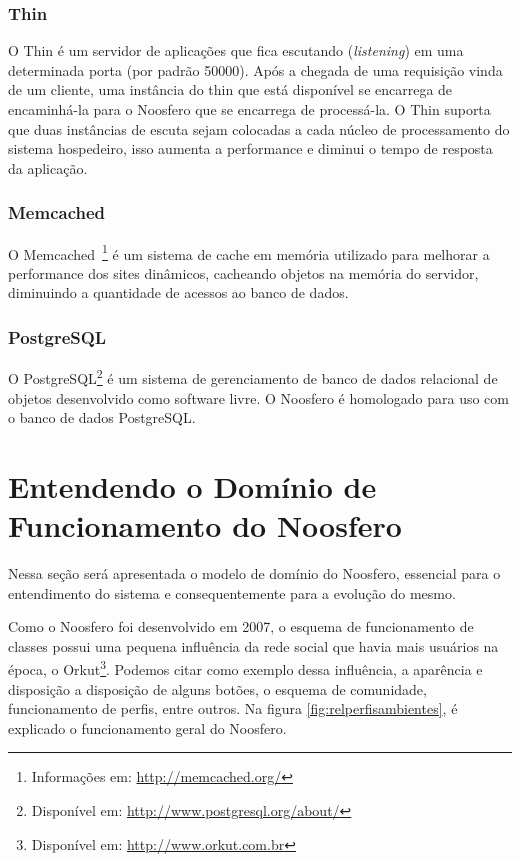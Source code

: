 \subsubsection*{Thin}

O Thin é um servidor de aplicações que fica escutando (\textit{listening}) em uma determinada porta (por padrão 50000). Após a chegada de uma requisição vinda de um cliente, uma instância do thin que está disponível se encarrega de encaminhá-la para o Noosfero que se encarrega de processá-la. O Thin suporta que duas instâncias de escuta sejam colocadas a cada núcleo de processamento do sistema hospedeiro, isso aumenta a performance e diminui o tempo de resposta da aplicação.

\subsubsection*{Memcached}

O Memcached~\footnote{Informações em: \url{http://memcached.org/}} é um sistema de cache em memória utilizado para melhorar a performance dos sites dinâmicos, cacheando objetos na memória do servidor, diminuindo a quantidade de acessos ao banco de dados.

\subsubsection*{PostgreSQL}

O PostgreSQL\footnote{Disponível em: \url{http://www.postgresql.org/about/}} é um sistema de gerenciamento de banco de dados relacional de objetos desenvolvido como software livre. O Noosfero é homologado para uso com o banco de dados PostgreSQL.

\section{Entendendo o Domínio de Funcionamento do Noosfero}
\label{sub:dominionoosfero}

Nessa seção será apresentada o modelo de domínio do Noosfero, essencial para o entendimento do sistema e consequentemente para a evolução do mesmo.

Como o Noosfero foi desenvolvido em 2007, o esquema de funcionamento de classes possui uma pequena influência da rede social que havia mais usuários na época, o Orkut\footnote{Disponível em: \url{http://www.orkut.com.br}}. Podemos citar como exemplo dessa influência, a aparência e disposição a disposição de alguns botões, o esquema de comunidade, funcionamento de perfis, entre outros. Na figura \ref{fig:relperfisambientes}, é explicado o funcionamento geral do Noosfero.

